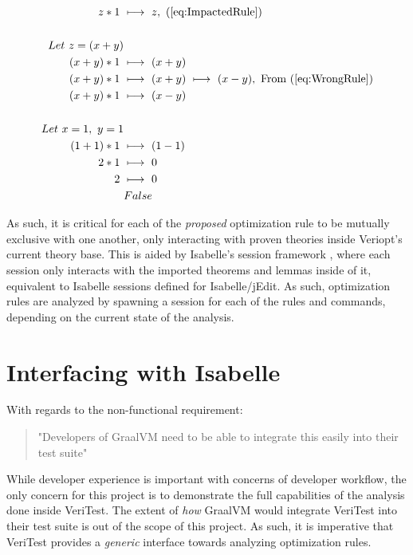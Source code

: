 \begin{align}
    z * 1\ &\longmapsto\ z,\ \text{(\ref{eq:ImpactedRule})} \\
    \nonumber \\
    Let\ z = (x + y) \\
    (x + y) * 1\ &\longmapsto\ (x + y) \\
    (x + y) * 1\ &\longmapsto\ (x + y)\ \longmapsto\ (x - y),\ \text{From (\ref{eq:WrongRule})} \\
    (x + y) * 1\ &\longmapsto\ (x - y) \\
    \nonumber \\
    Let\ x = 1,\ y = 1 \\
    (1 + 1) * 1\ &\longmapsto\ (1 - 1) \\
    2 * 1\ &\longmapsto\ 0 \\
    2\ &\longmapsto\ 0 \\
    &False
\end{align}

As such, it is critical for each of the \emph{proposed} optimization rule to be mutually exclusive with one another, only interacting with 
proven theories inside Veriopt's current theory base. This is aided by Isabelle's session framework \cite[Ch. 2]{isabelleSystem}, where 
each session only interacts with the imported theorems and lemmas inside of it, equivalent to Isabelle sessions defined for Isabelle/jEdit.
As such, optimization rules are analyzed by spawning a session for each of the rules and commands, depending on the current state of the 
analysis.

\section{Interfacing with Isabelle}
\label{sec:interface}

With regards to the non-functional requirement: 

\begin{quote}
    "Developers of GraalVM need to be able to integrate this easily into their test suite"
\end{quote}

While developer experience is important with concerns of developer workflow, the only concern for this project is to demonstrate the full 
capabilities of the analysis done inside VeriTest.
The extent of \emph{how} GraalVM would integrate VeriTest into their test suite is out of the scope of this project. As such, it is imperative 
that VeriTest provides a \emph{generic} interface towards analyzing optimization rules.

